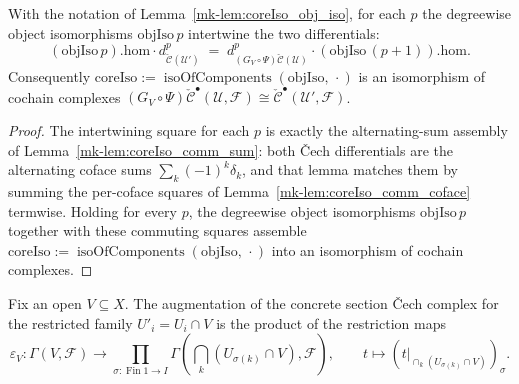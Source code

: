 \begin{lemma}\label{mk-lem:coreIso_comm}
  \leanok

  With the notation of Lemma~\ref{mk-lem:coreIso_obj_iso}, for each \(p\) the degreewise object
  isomorphisms \(\mathrm{objIso}\,p\) intertwine the two differentials:
  \[
    (\mathrm{objIso}\,p).\mathrm{hom} \cdot
      d^{p}_{\check{\mathcal{C}}(\mathcal{U}')}
      \;=\;
    d^{p}_{(G_V\circ\Psi)\check{\mathcal{C}}(\mathcal{U})} \cdot
      (\mathrm{objIso}\,(p+1)).\mathrm{hom}.
  \]
  Consequently \(\mathrm{coreIso} := \operatorname{isoOfComponents}(\mathrm{objIso},\,\cdot)\)
  is an isomorphism of cochain complexes \((G_V\circ\Psi)\check{\mathcal{C}}^\bullet(\mathcal{U},
  \mathcal{F}) \cong \check{\mathcal{C}}^\bullet(\mathcal{U}', \mathcal{F})\).
\end{lemma}
\begin{proof}
  \leanok
  The intertwining square for each \(p\) is exactly the alternating-sum assembly of
  Lemma~\ref{mk-lem:coreIso_comm_sum}: both {\v C}ech differentials are the alternating coface sums
  \(\sum_k (-1)^k \delta_k\), and that lemma matches them by summing the per-coface squares of
  Lemma~\ref{mk-lem:coreIso_comm_coface} termwise. Holding for every \(p\), the degreewise object
  isomorphisms \(\mathrm{objIso}\,p\) together with these commuting squares assemble
  \(\mathrm{coreIso} := \operatorname{isoOfComponents}(\mathrm{objIso},\,\cdot)\) into an
  isomorphism of cochain complexes.

\end{proof}

\begin{definition}\label{mk-def:sectionCechAugV}
  \leanok

  Fix an open \(V \subseteq X\). The augmentation of the concrete section {\v C}ech complex for
  the restricted family \(U'_i=U_i\cap V\) is the product of the restriction maps
  \[
    \varepsilon_V : \Gamma(V, \mathcal{F}) \longrightarrow
      \prod_{\sigma:\operatorname{Fin}1\to I}
        \Gamma\!\left(\bigcap_k(U_{\sigma(k)}\cap V),\mathcal{F}\right),
    \qquad
    t\longmapsto
      \left(t\big|_{\cap_k(U_{\sigma(k)}\cap V)}\right)_{\sigma}.
  \]
\end{definition}

